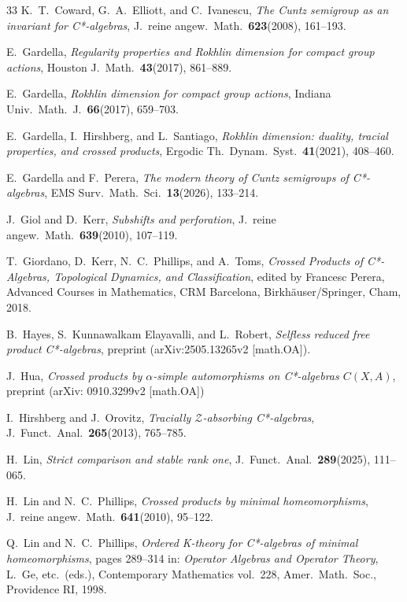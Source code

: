 \documentclass[10pt]{amsart}
\numberwithin{equation}{section}
\theoremstyle{definition}
\begin{document}
\begin{thebibliography}{33}
K.~T.\  Coward, G.~A.\  Elliott, and C.~Ivanescu,
{\emph{The Cuntz semigroup as an invariant for C*-algebras}},
J.~reine angew.\  Math.\  {\textbf{623}}(2008), 161--193.

E.~Gardella,
{\emph{Regularity properties and Rokhlin dimension for
 compact group actions}},
Houston J.\  Math.\  {\textbf{43}}(2017), 861--889.

E.~Gardella,
{\emph{Rokhlin dimension for compact group actions}},
Indiana Univ.\  Math.\  J.\  {\textbf{66}}(2017), 659--703.

E.~Gardella, I.~Hirshberg, and L.~Santiago,
{\emph{Rokhlin dimension: duality, tracial properties, and crossed products}},
Ergodic Th.\  Dynam.\  Syst.\  {\textbf{41}}(2021), 408--460.

E.~Gardella and F.~Perera,
{\emph{The modern theory of Cuntz semigroups of C*-algebras}},
EMS Surv.\  Math.\  Sci.\  {\textbf{13}}(2026), 133--214.

J.~Giol and D.~Kerr,
{\emph{Subshifts and perforation}},
J.~reine angew.\  Math.\  {\textbf{639}}(2010), 107--119.

T.~Giordano, D.~Kerr, N.~C.~Phillips, and A.~Toms,
{\emph{Crossed Products of C*-Algebras,
 Topological Dynamics, and Classification}},
edited by Francesc Perera,
Advanced Courses in Mathematics, CRM Barcelona,
Birkh\"{a}user/Springer, Cham, 2018.

B.~Hayes, S.~Kunnawalkam Elayavalli, and L.~Robert,
{\emph{Selfless reduced free product C*-algebras}},
preprint (arXiv:2505.13265v2 [math.OA]).

J.~Hua,
{\emph{Crossed products by $\alpha$-simple automorphisms on
 C*-algebras $C (X, A)$}},
preprint (arXiv: 0910.3299v2 [math.OA])

I.~Hirshberg and J.~Orovitz,
{\emph{Tracially ${\mathcal{Z}}$-absorbing C*-algebras}},
J.~Funct.\  Anal.\  {\textbf{265}}(2013), 765--785.

H.~Lin,
{\emph{Strict comparison and stable rank one}},
J.~Funct.\  Anal.\  {\textbf{289}}(2025), 111--065.

H.~Lin and N.~C.\  Phillips,
{\emph{Crossed products by minimal homeomorphisms}},
J.~reine angew.\  Math.\  {\textbf{641}}(2010), 95--122.

Q.~Lin and N.~C.\  Phillips,
{\emph{Ordered K-theory for C*-algebras of minimal homeomorphisms}},
pages 289--314 in: {\emph{Operator Algebras and Operator Theory}},
L.~Ge, etc.\ (eds.),
Contemporary Mathematics vol.~228,
Amer.\  Math.\  Soc., Providence RI, 1998.


\end{thebibliography}
\end{document}
